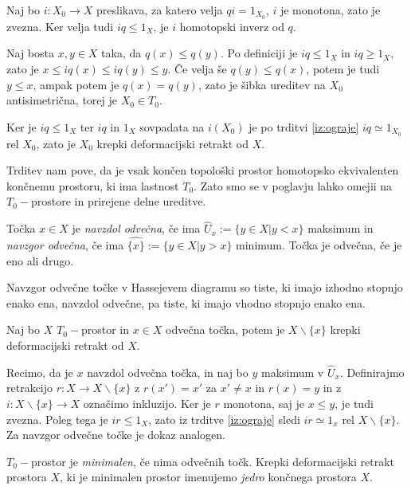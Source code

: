 \documentclass[mat1]{fmfdelo}
\begin{document}
\begin{dokaz}%
    Naj bo $i\colon X_0\rightarrow X$ preslikava, za katero velja $qi=1_{X_0}$, $i$ je monotona, zato je zvezna. Ker velja tudi $iq \leq 1_X$, je $i$ homotopski inverz od $q$.

    Naj bosta $x,y\in X$ taka, da $q(x)\leq q(y)$. Po definiciji je $iq \leq 1_X$ in $iq \geq 1_X$, zato je $x \leq iq(x) \leq iq(y) \leq y$. Če velja še $q(y)\leq q(x)$, potem je tudi $y\leq x$, ampak potem je $q(x)=q(y)$, zato je šibka ureditev na $X_0$ antisimetrična, torej je $X_0\in T_0$.
    
    Ker je $iq\leq 1_X$ ter $iq$ in $1_X$ sovpadata na $i(X_0)$ je po trditvi \ref{iz:ograje} 
    $iq \simeq 1_{X_0}$ rel $X_0$, zato je $X_0$ krepki deformacijski retrakt od $X$.
\end{dokaz}
    
Trditev nam pove, da je vsak končen topološki prostor homotopsko ekvivalenten končnemu prostoru, ki ima lastnost $T_0$. Zato smo se v poglavju lahko omejii na $T_0-$prostore in prirejene delne ureditve.

\begin{definicija}
    Točka $x \in X$ je \emph{navzdol odvečna}, če ima $\widehat{U}_x:=\{y\in X | y < x\}$ maksimum in \emph{navzgor odvečna}, če ima $\widehat{\{x\}}:=\{y\in X | y > x\}$ minimum. 
    Točka je odvečna, če je eno ali drugo.
\end{definicija}

Navzgor odvečne točke v Hassejevem diagramu so tiste, ki imajo 
izhodno stopnjo enako ena, navzdol odvečne, pa tiste, ki imajo vhodno stopnjo enako ena.
\begin{trditev}
Naj bo $X$ $T_0-$prostor in $x\in X$ odvečna točka, potem je $X\backslash \{x\}$ krepki deformacijski retrakt od $X$.
\end{trditev}

\begin{dokaz}
Recimo, da je $x$ navzdol odvečna točka, in naj bo $y$ 
maksimum v $\widehat{U}_x$. Definirajmo retrakcijo $r\colon X\rightarrow 
X\backslash \{x\}$ z $r(x')=x'$ za $x'\neq x$ in $r(x)=y$ in z $i\colon X\backslash\{x\} 
\rightarrow X$ označimo inkluzijo. Ker je $r$ monotona, saj je $x\leq y$, je tudi zvezna. Poleg tega je $ir\leq 1_X$, zato iz trditve \ref{iz:ograje} sledi $ir \simeq 1_x$ rel 
$X\backslash\{x\}$. Za navzgor odvečne točke je 
dokaz analogen.
\end{dokaz}

\begin{definicija}
    $T_0-$prostor je \emph{minimalen}, če nima odvečnih točk. Krepki deformacijski retrakt prostora $X$, ki je minimalen prostor imenujemo \emph{jedro} končnega prostora $X$.
\end{definicija}
\end{document}
